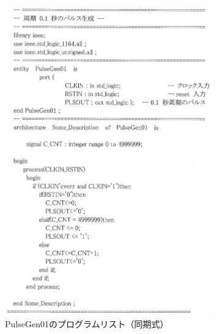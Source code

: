 \documentclass{jlreq}
\numberwithin{equation}{section}
\begin{document}
\begin{figure}[H]
  \centering
  \includegraphics[width=0.8\textwidth]{assets/PulseGen01.png}
  \caption{PulseGen01のプログラムリスト（同期式）}
\end{figure}
\end{document}
